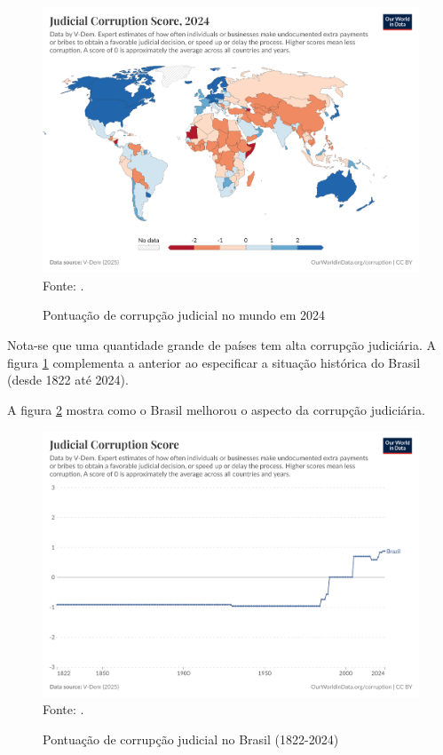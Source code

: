 \begin{figure}[H]
	\centering
	\caption{Pontuação de corrupção judicial no mundo em 2024}
	\includegraphics[width=1\linewidth]{figuras/judicial-corruption-score}
	\label{fig:judicial-corruption-score}
	\footnotesize{Fonte: \cite{judicial-corruption-score}.}
\end{figure}

Nota-se que uma quantidade grande de países tem alta corrupção judiciária. A figura \ref{fig:judicial-corruption-score} complementa a anterior ao especificar a situação histórica do Brasil (desde 1822 até 2024).

A figura \ref{fig:judicial-corruption-score-brazil} mostra como o Brasil melhorou o aspecto da corrupção judiciária. 

\begin{figure}[H]
    \centering
    \caption{Pontuação de corrupção judicial no Brasil (1822-2024)}
    \includegraphics[width=1\linewidth]{figuras/judicial-corruption-score-brazil}
    \label{fig:judicial-corruption-score-brazil}
    \footnotesize{Fonte: \cite{judicial-corruption-score}.}
\end{figure}

